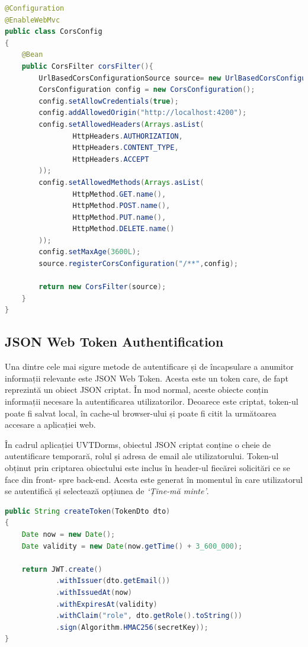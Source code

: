 \documentclass[12pt,a4paper]{report}
\theoremstyle{definition}
\theoremstyle{remark}
\begin{document}
\begin{lstlisting}[language=Java, caption={Clasa prin care se realizează configurarea CORS}]
@Configuration
@EnableWebMvc
public class CorsConfig
{
    @Bean
    public CorsFilter corsFilter(){
        UrlBasedCorsConfigurationSource source= new UrlBasedCorsConfigurationSource();
        CorsConfiguration config = new CorsConfiguration();
        config.setAllowCredentials(true);
        config.addAllowedOrigin("http://localhost:4200");
        config.setAllowedHeaders(Arrays.asList(
                HttpHeaders.AUTHORIZATION,
                HttpHeaders.CONTENT_TYPE,
                HttpHeaders.ACCEPT
        ));
        config.setAllowedMethods(Arrays.asList(
                HttpMethod.GET.name(),
                HttpMethod.POST.name(),
                HttpMethod.PUT.name(),
                HttpMethod.DELETE.name()
        ));
        config.setMaxAge(3600L);
        source.registerCorsConfiguration("/**",config);

        return new CorsFilter(source);
    }
}
\end{lstlisting}

\subsection{JSON Web Token Authentification}
\par Una dintre cele mai sigure metode de autentificare și de încapsulare a anumitor informații relevante este JSON Web Token\cite{jones2015json}. Acesta este un token care, de fapt reprezintă un obiect JSON criptat. În mod normal, aceste obiecte conțin informații necesare la autentificarea utilizatorilor. Deoarece este criptat, token-ul poate fi salvat local, în cache-ul browser-ului și poate fi citit la următoarea accesare a aplicației web.

\par În cadrul aplicației UVTDorms, obiectul JSON criptat conține o cheie de autentificare temporară, rolul și adresa de email ale utilizatorului. Token-ul obținut prin criptarea obiectului este inclus în header-ul fiecărei solicitări ce se face din front- spre back-end. Acesta este generat în momentul în care utilizatorul se autentifică și selectează opțiunea de \textit{`Ține-mă minte'}.

\begin{lstlisting}[language=Java, caption={Funcția de generare a token-ului}]
public String createToken(TokenDto dto)
{
    Date now = new Date();
    Date validity = new Date(now.getTime() + 3_600_000);

    return JWT.create()
            .withIssuer(dto.getEmail())
            .withIssuedAt(now)
            .withExpiresAt(validity)
            .withClaim("role", dto.getRole().toString())
            .sign(Algorithm.HMAC256(secretKey));
}
\end{lstlisting}
\end{document}
